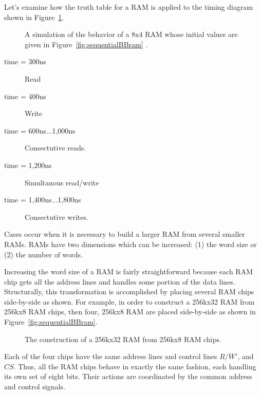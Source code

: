 Let's examine how the truth table for a RAM is applied to the timing diagram shown in Figure~\ref{fig:sequentialBBRamReadWrite}.

\begin{figure}[ht]
\caption{A simulation of the behavior of a 8x4 RAM whose initial values are given in Figure~\ref{fig:sequentialBBram}  .}
\label{fig:sequentialBBRamReadWrite}
\end{figure}

\begin{description}
\item[time = 300ns] Read

\item[time = 400ns] Write

\item[time = 600ns...1,000ns]  Consectutive reads.

\item[time = 1,200ns] Simultanous read/write 

\item[time = 1,400ns...1,800ns] Consectutive writes.

\end{description}



Cases occur when it is necessary to build a larger RAM from several
smaller RAMs.  RAMs have two dimensions which can be increased: (1) the word size or 
(2) the number of words.  

Increasing the word size of a RAM is fairly straightforward because 
each RAM chip gets all the address lines and handles some portion of 
the data lines.  Structurally, this transformation is accomplished by
placing several RAM chips side-by-side as shown. For example, in order 
to construct a 256kx32 RAM from 256kx8 RAM chips, then four, 256kx8 RAM are 
placed side-by-side as shown in Figure~\ref{fig:sequentialBBram}.

\begin{figure}[ht]
\caption{The construction of a 256kx32 RAM from 256kx8 RAM chips.}
\label{fig:sequentialBBwide}
\end{figure}

Each of the four chips have the same address lines and control
lines $R/W'$, and $CS$.  Thus, all the RAM chips behave in exactly the same 
fashion, each handling its own set of eight bits.  Their actions are coordinated
by the common address and control signals.

